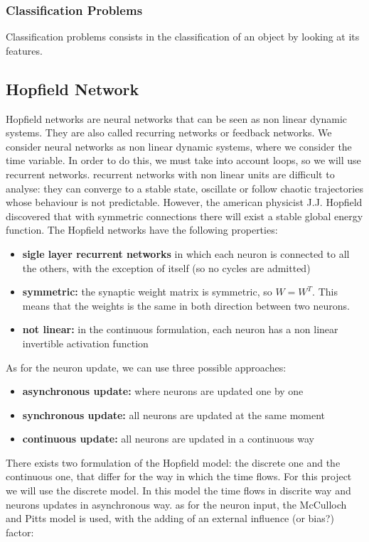 \documentclass[letterpaper,twocolumn,10pt]{article}
\begin{document}
\subsubsection{Classification Problems}
Classification problems consists in the classification of an object by looking at its features.

\subsection{Hopfield Network \cite{pelillo}}
Hopfield networks are neural networks that can be seen as non linear dynamic systems. They are also called recurring networks or feedback networks. 
We consider neural networks as non linear dynamic systems, where we consider the time variable. In order to do this, we must take into account loops, so we will use recurrent networks.
recurrent networks with non linear units are difficult to analyse: they can converge to a stable state, oscillate or follow chaotic trajectories whose behaviour is not predictable.
However, the american physicist J.J. Hopfield discovered that with symmetric connections there will exist a stable global energy function.
The Hopfield networks have the following properties:
\begin{itemize}
\item\textbf{sigle layer recurrent networks} in which each neuron is connected to all the others, with the exception of itself (so no cycles are admitted)
\item\textbf{symmetric:} the synaptic weight matrix is symmetric, so $W=W^T$. This means that the weights is the same in both direction between two neurons.
\item\textbf{not linear:} in the continuous formulation, each neuron has a non linear invertible activation function
\end{itemize}
As for the neuron update, we can use three possible approaches:
\begin{itemize}
\item\textbf{asynchronous update:} where neurons are updated one by one
\item\textbf{synchronous update:} all neurons are updated at the same moment
\item\textbf{continuous update:} all neurons are updated in a continuous way
\end{itemize}
There exists two formulation of the Hopfield model: the discrete one and the continuous one, that differ for the way in which the time flows.
For this project we will use the discrete model. In this model the time flows in discrite way and neurons updates in asynchronous way. as for the neuron input, the McCulloch and Pitts model is used, with the adding of an external influence (or bias?) factor:
\end{document}
